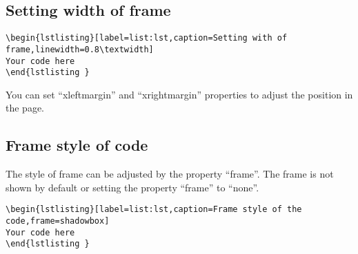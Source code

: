 \subsection{Setting width of frame}

\begin{lstlisting}[label=list:lst,caption=Setting width of frame,linewidth=0.8\textwidth]
\begin{lstlisting}[label=list:lst,caption=Setting with of frame,linewidth=0.8\textwidth]
Your code here
\end{lstlisting }
\end{lstlisting}

You can set ``\textsf{xleftmargin}'' and ``\textsf{xrightmargin}'' properties to adjust the position in the page.

\subsection{Frame style of code}

The style of frame can be adjusted by the property ``\textsf{frame}''. The frame is not shown by default or setting the property ``\textsf{frame}'' to ``none''.

\begin{lstlisting}[label=list:lst,caption=Frame style of the code,frame=shadowbox]
\begin{lstlisting}[label=list:lst,caption=Frame style of the code,frame=shadowbox]
Your code here
\end{lstlisting }
\end{lstlisting}